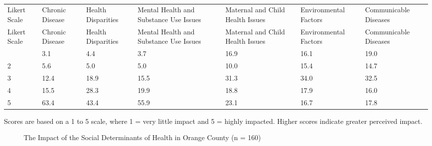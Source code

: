 \documentclass[
  english,
  letterpaper,
]{report}
\begin{document}
\begin{longtable}[]{@{}lllllll@{}}

\caption{\label{tbl-oc-impact-hlth-issue}The Impact of Health Issues in
Orange County (n = 163)}

\tabularnewline

\caption{}\label{T_c73a6}\tabularnewline
\toprule\noalign{}
Likert Scale & Chronic Disease & Health Disparities & Mental Health and
Substance Use Issues & Maternal and Child Health Issues & Environmental
Factors & Communicable Diseases \\
\midrule\noalign{}
\endfirsthead
\toprule\noalign{}
Likert Scale & Chronic Disease & Health Disparities & Mental Health and
Substance Use Issues & Maternal and Child Health Issues & Environmental
Factors & Communicable Diseases \\
\midrule\noalign{}
\endhead
\bottomrule\noalign{}
\endlastfoot
1 & 3.1 & 4.4 & 3.7 & 16.9 & 16.1 & 19.0 \\
2 & 5.6 & 5.0 & 5.0 & 10.0 & 15.4 & 14.7 \\
3 & 12.4 & 18.9 & 15.5 & 31.3 & 34.0 & 32.5 \\
4 & 15.5 & 28.3 & 19.9 & 18.8 & 17.9 & 16.0 \\
5 & 63.4 & 43.4 & 55.9 & 23.1 & 16.7 & 17.8 \\

\end{longtable}

\begin{tcolorbox}[enhanced jigsaw, breakable, leftrule=.75mm, title=\textcolor{quarto-callout-note-color}{\faInfo}\hspace{0.5em}{Note}, bottomrule=.15mm, opacityback=0, left=2mm, colback=white, bottomtitle=1mm, coltitle=black, colbacktitle=quarto-callout-note-color!10!white, colframe=quarto-callout-note-color-frame, opacitybacktitle=0.6, toptitle=1mm, titlerule=0mm, arc=.35mm, rightrule=.15mm, toprule=.15mm]

Scores are based on a 1 to 5 scale, where 1 = very little impact and 5 =
highly impacted. Higher scores indicate greater perceived impact.

\end{tcolorbox}

\begin{figure}


\caption{\label{fig-oc-impact-sdoh}The Impact of the Social Determinants
of Health in Orange County (n = 160)}

\end{figure}%
\end{document}
